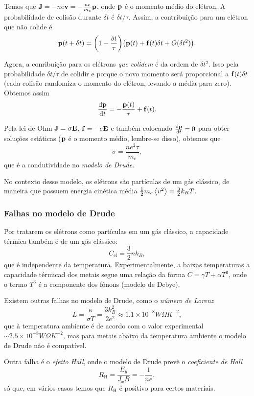 \documentclass[a4paper,fleqn,12pt]{article}
\begin{document}
Temos que $\vb{J} = -ne \vb{v} = - \frac{ne}{m_e} \vb{p}$, onde $\vb{p}$ é o momento médio do elétron. A probabilidade de colisão durante $\delta t$ é $\delta t / \tau$. Assim, a contribuição para um elétron que não colide é
$$
\vb{p}(t+\delta t) = \qty(1 - \frac{\delta t}{\tau})
\qty(\vb{p}(t) + \vb{f}(t) \delta t + O(\delta t^2)).
$$

Agora, a conribuição para os elétrons \textit{que colidem} é da ordem de $\delta t^2$. Isso pela probabilidade $\delta t / \tau$ de colidir e porque o novo momento será proporcional a $\vb{f}(t) \delta t$ (cada colisão randomiza o momento do elétron, levando a média para zero). Obtemos assim
$$
\dv{\vb{p}}{t} = - \frac{\vb{p}(t)}{\tau} + \vb{f}(t).
$$

Pela lei de Ohm $\vb{J} = \sigma \vb{E}$, $\vb{f} = -e \vb{E}$ e também colocando $\dv{\vb{p}}{t} = 0$ para obter soluções estáticas ($\vb{p}$ é o momento médio, lembre-se disso), obtemos que
\begin{equation} \label{eq:drude-sigma}
\sigma = \frac{n e^2 \tau}{m_e},
\end{equation}
que é a condutividade no \textit{modelo de Drude}.

No contexto desse modelo, os elétrons são partículas de um gás clássico, de maneira que possuem energia cinética média $\frac{1}{2} m_e \ev{v^2} = \frac{3}{2} k_B T$.

\subsubsection{Falhas no modelo de Drude}

Por tratarem os elétrons como partículas em um gás clássico, a capacidade térmica também é de um gás clássico:
$$
C_{\text{el}} = \frac{3}{2} n k_B,
$$
que é independente da temperatura. Experimentalmente, a baixas temperaturas a capacidade térmicad dos metais segue uma relação da forma $C = \gamma T + \alpha T^3$, onde o termo $T^3$ é a componente dos fônons (modelo de Debye).

Existem outras falhas no modelo de Drude, como o \textit{número de Lorenz}
$$
L = \frac{\kappa}{\sigma T} = \frac{3 k_B^2}{2e^2} \approx 1.1 \times 10^{-8} W \Omega \unit{K}^{-2},
$$
que à temperatura ambiente é de acordo com o valor experimental $\sim 2.5 \times 10^{-8} W \Omega \unit{K}^{-2}$, mas para metais abaixo da temperatura ambiente o modelo de Drude não é compatível.

Outra falha é o \textit{efeito Hall}, onde o modelo de Drude prevê o \textit{coeficiente de Hall}
$$
R_{\text{H}} = \frac{E_y}{J_x B} = - \frac{1}{n e},
$$
só que, em vários casos temos que $R_{\text{H}}$ é positivo para certos materiais.
\end{document}
